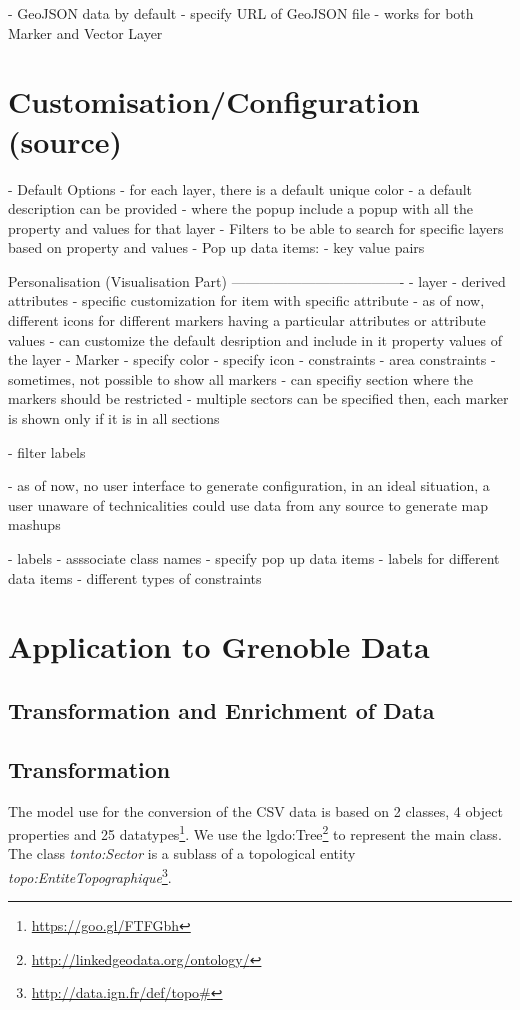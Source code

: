 \documentclass[a4paper,pagenum,english]{rnti}
\begin{document}
{	- GeoJSON data by default
		- specify URL of GeoJSON file
		- works for both Marker and Vector Layer


\section{Customisation/Configuration (source)}\label{section:customisation}
- Default Options
	- for each layer, there is a default unique color
	- a default description can be provided
		- where the popup include a popup with all the property and values for that layer
	- Filters to be able to search for specific layers based on property and values
- Pop up data items:
	- key value pairs
	
	
Personalisation (Visualisation Part)
-------------------------------------
	- layer
		- derived attributes
		- specific customization for item with specific attribute
			- as of now, different icons for different markers having a particular attributes or attribute values
		- can customize the default desription and include in it property values of the layer
	- Marker
		- specify color
		- specify icon
	- constraints
		- area constraints
			- sometimes, not possible to show all markers
			- can specifiy section where the markers should be restricted
			- multiple sectors can be specified then, each marker is shown only if it is in all sections

	- filter labels

- as of now, no user interface to generate configuration, in an ideal situation, a user unaware of technicalities could use data from any source to generate map mashups


- labels 
- asssociate class names
- specify pop up data items
	- labels for different data items
- different types of constraints


\section{Application to Grenoble Data}\label{section:customisation}

\subsection{Transformation and Enrichment of Data}

\subsection{Transformation}
The model use for the conversion of the CSV data is based on 2 classes, 4 object properties and 25 datatypes\footnote{\url{https://goo.gl/FTFGbh}}.  
We use the lgdo:Tree\footnote{\url{http://linkedgeodata.org/ontology/}} to represent the main class. The class \textit{tonto:Sector} is a sublass of a topological entity \textit{topo:EntiteTopographique}\footnote{\url{http://data.ign.fr/def/topo#}}. 


}
\end{document}
